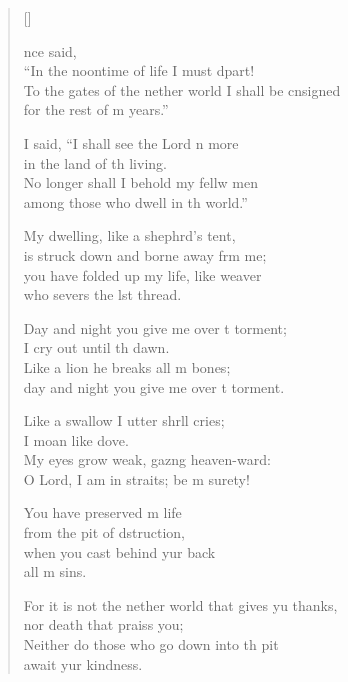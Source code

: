 \settowidth{\versewidth}{To the gates of the nether world I shall be con\-signed *}
\begin{verse}[\versewidth]
  \begin{patverse}
    nce  said,\Med\\
“In the noontime of life I must dpart!\\
To the gates of the nether world I shall be cn\-signed\Med\\
for the rest of m years.”

I said, “I shall see the Lord n more\Med\\
in the land of th living.\\
No longer shall I behold my fellw men\Med\\
among those who dwell in th world.”

My dwelling, like a shephrd’s tent,\Med\\
is struck down and borne away frm me;\\
you have folded up my life, like  weaver\Med\\
who severs the lst thread.

Day and night you give me over t torment;\Med\\
I cry out until th dawn.\\
Like a lion he breaks all m bones;\Med\\
day and night you give me over t torment.

Like a swallow I utter shr\pointup{\i}ll cries;\Med\\
I moan like  dove.\\
My eyes grow weak, gaz\pointup{\i}ng heaven-ward:\Med\\
O Lord, I am in straits; be m surety!

You have preserved m life\Med\\
from the pit of dstruction,\\
when you cast behind yur back\Med\\
all m sins.

For it is not the nether world that gives yu thanks,\Med\\
nor death that praiss you;\\
Neither do those who go down into th pit\Med\\
await yur kindness.


\end{patverse}
\end{verse}
